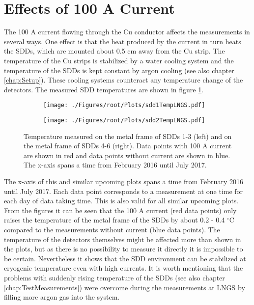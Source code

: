 \section{Effects of 100 A Current}

The 100 A current flowing through the Cu conductor affects the measurements in several ways. One effect is that the heat produced by the current in turn heats the SDDs, which are mounted about 0.5 cm away from the Cu strip. The temperature of the Cu strips is stabilized by a water cooling system and the temperature of the SDDs is kept constant by argon cooling (see also chapter \ref{chap:Setup}). These cooling systems counteract any temperature change of the detectors. The measured SDD temperatures are shown in figure \ref{fig:sddTempLngs}.
\begin{figure}[h]
 \centering
 \begin{subfigure}{.49\textwidth}
 \centering
 \texttt{[image: ./Figures/root/Plots/sdd1TempLNGS.pdf]}
 \end{subfigure}
 \hfill
 \begin{subfigure}{.49\textwidth}
 \centering
 \texttt{[image: ./Figures/root/Plots/sdd2TempLNGS.pdf]}
 \end{subfigure}
 \caption{Temperature measured on the metal frame of SDDs 1-3 (left) and on the metal frame of SDDs 4-6 (right). Data points with 100 A current are shown in red and data points without current are shown in blue. The x-axis spans a time from February 2016 until July 2017.}
 \label{fig:sddTempLngs}
\end{figure}
The x-axis of this and similar upcoming plots spans a time from February 2016 until July 2017. Each data point corresponds to a measurement at one time for each day of data taking time. This is also valid for all similar upcoming plots. From the figures it can be seen that the 100 A current (red data points) only raises the temperature of the metal frame of the SDDs by about 0.2 - 0.4 $^{\circ}$C compared to the measurements without current (blue data points). The temperature of the detectors themselves might be affected more than shown in the plots, but as there is no possibility to measure it directly it is impossible to be certain. Nevertheless it shows that the SDD environment can be stabilized at cryogenic temperature even with high currents. It is worth mentioning that the problems with suddenly rising temperature of the SDDs (see also chapter \ref{chap:TestMeasurements}) were overcome during the measurements at LNGS by filling more argon gas into the system. 

